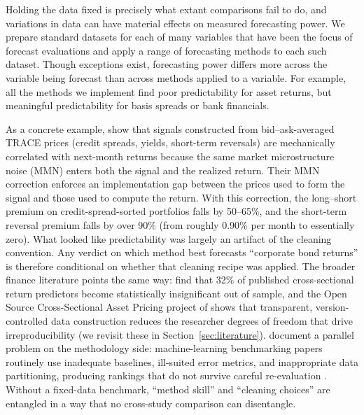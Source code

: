\documentclass{article}
\begin{document}

Holding the data fixed is precisely what extant comparisons fail to do, and variations in data can have material effects on measured forecasting power. We prepare standard datasets for each of many variables that have been the focus of forecast evaluations and apply a range of forecasting methods to each such dataset. Though exceptions exist, forecasting power differs more across the variable being forecast than across methods applied to a variable. For example, all the methods we implement find poor predictability for asset returns, but meaningful predictability for basis spreads or bank financials.

As a concrete example, \citet{Dickerson2024} show that signals constructed from bid--ask-averaged TRACE prices (credit spreads, yields, short-term reversals) are mechanically correlated with next-month returns because the same market microstructure noise (MMN) enters both the signal and the realized return. Their MMN correction enforces an implementation gap between the prices used to form the signal and those used to compute the return. With this correction, the long--short premium on credit-spread-sorted portfolios falls by 50--65\%, and the short-term reversal premium falls by over 90\% (from roughly 0.90\% per month to essentially zero). What looked like predictability was largely an artifact of the cleaning convention. Any verdict on which method best forecasts ``corporate bond returns'' is therefore conditional on whether that cleaning recipe was applied. The broader finance literature points the same way: \citet{Jensen2023} find that 32\% of published cross-sectional return predictors become statistically insignificant out of sample, and the Open Source Cross-Sectional Asset Pricing project of \citet{Chen2022} shows that transparent, version-controlled data construction reduces the researcher degrees of freedom that drive irreproducibility (we revisit these in Section~\ref{sec:literature}). \citet{Hewamalage2023} document a parallel problem on the methodology side: machine-learning benchmarking papers routinely use inadequate baselines, ill-suited error metrics, and inappropriate data partitioning, producing rankings that do not survive careful re-evaluation \citep{Prater2024}. Without a fixed-data benchmark, ``method skill'' and ``cleaning choices'' are entangled in a way that no cross-study comparison can disentangle.
\end{document}
